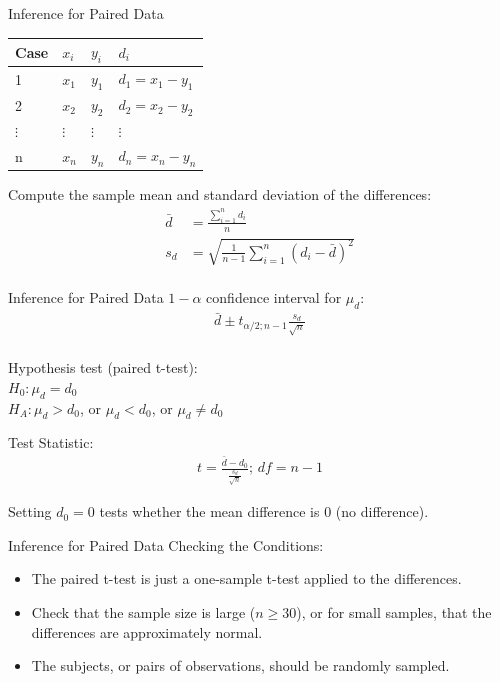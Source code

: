 \documentclass[10pt, fleqn]{beamer}
\begin{document}
\begin{frame}{Inference for Paired Data}
\begin{tabular}{llll}
Case & $x_i$ & $y_i$ & $d_i$\\
\hline
1 & $x_1$ & $y_1$ & $d_1 = x_1 - y_1$\\
2 & $x_2$ & $y_2$ & $d_2 = x_2 - y_2$\\
$\vdots$ & $\vdots$ & $\vdots$ & $\vdots$\\
n & $x_n$ & $y_n$ & $d_n = x_n - y_n$\\
\end{tabular}
\bigskip

Compute the sample mean and standard deviation of the differences:
\begin{align*}
\bar{d} &= \frac{\sum_{i=1}^n d_i}{n}\\
s_d &= \sqrt{\frac{1}{n-1} \sum_{i=1}^n (d_i - \bar{d})^2}\\
\end{align*}
\end{frame}

\begin{frame}{Inference for Paired Data}
$1-\alpha$ confidence interval for $\mu_d$:
\begin{align*}
\bar{d} \pm t_{\alpha / 2; n-1} \frac{s_d}{\sqrt{n}}\\
\end{align*}

Hypothesis test (paired t-test):\\
$H_0: \mu_d = d_0$\\
$H_A: \mu_d > d_0$, or $\mu_d < d_0$, or $\mu_d \neq d_0$\\
\bigskip

Test Statistic:
\begin{align*}
t = \frac{\bar{d} - d_0}{\frac{s_d}{\sqrt{n}}} \text{; } df=n-1
\end{align*}

Setting $d_0=0$ tests whether the mean difference is 0 (no difference).
\end{frame}

\begin{frame}{Inference for Paired Data}
Checking the Conditions:\\
\begin{itemize}
\item The paired t-test is just a one-sample t-test applied to the differences.
\vspace{5pt}
\item Check that the sample size is large ($n \geq 30$), or for small samples, that the differences are approximately normal. 
\vspace{5pt}
\item The subjects, or pairs of observations, should be randomly sampled.
\end{itemize}
\end{frame}
\end{document}
